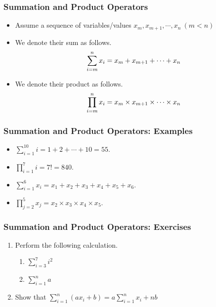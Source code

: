 \documentclass[pdflatex, 12pt]{beamer}
\begin{document}
\begin{frame}
\frametitle{Summation and Product Operators}
\begin{itemize}
\item Assume a sequence of variables/values $x_m, x_{m + 1}, \cdots, x_n \ (m < n)$
\vspace{0.4cm}
\item We denote their sum as follows.
 \begin{equation}
 \sum_{i = m}^{n} x_i = x_m + x_{m + 1} + \cdots + x_n \notag
 \end{equation}
\item We denote their product as follows.
 \begin{equation}
 \prod_{i = m}^{n} x_i = x_m \times x_{m + 1} \times \cdots \times x_n \notag 
 \end{equation}
\end{itemize}
\end{frame}

\begin{frame}
\frametitle{Summation and Product Operators: Examples}
\begin{itemize}
\item $\sum_{i = 1}^{10} i = 1 + 2 + \cdots + 10 = 55.$
\vspace{0.4cm}
\item $\prod_{i = 1}^{7} i = 7! = 840.$
\vspace{0.4cm}
\item $\sum_{i = 1}^{6} x_i = x_1 + x_2 + x_3 + x_4 + x_5 + x_6.$
\vspace{0.4cm}
\item $\prod_{j = 2}^{5} x_j = x_2 \times x_3 \times x_4 \times x_5.$
\end{itemize}
\end{frame}

\begin{frame}
\frametitle{Summation and Product Operators: Exercises}
\begin{enumerate}
\item Perform the following calculation.
 \begin{enumerate}
 \item $\sum_{i = 3}^{7} i^2$
 \item $\sum_{i = 1}^{n} a$
 \end{enumerate}
\vspace{0.4cm}
\item Show that $\sum_{i = 1}^{n} (ax_i + b) = a\sum_{i = 1}^{n} x_i + nb$
\end{enumerate}
\end{frame}
\end{document}
